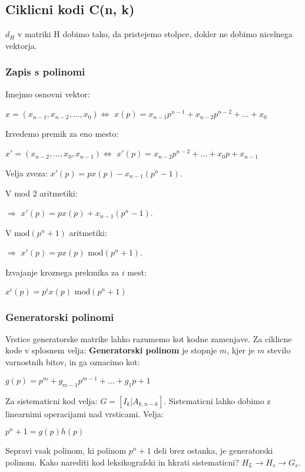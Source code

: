 \documentclass{article}
\begin{document}
\begin{multicols}{4}
	\subsection{Ciklicni kodi C(n, k)}
	$d_H$ v matriki H dobimo tako, da pristejemo stolpce, dokler ne dobimo nicelnega vektorja.

	\subsubsection{Zapis s polinomi}
	Imejmo osnovni vektor:
	\begin{center}
		$x = (x_{n-1}, x_{n-2}, \dots, x_0) \Leftrightarrow$
		$x(p) = x_{n-1}p^{n-1} + x_{n-2}p^{n-2} + \dots + x_0$
	\end{center}
	Izvedemo premik za eno mesto:
	\begin{center}
		$x' = (x_{n-2}, \dots, x_0, x_{n-1}) \Leftrightarrow$
		$x'(p) = x_{n-2}p^{n-2} + \dots + x_0p + x_{n-1}$
	\end{center}
	Velja zveza: $x'(p) = px(p) - x_{n-1}(p^n -1)$.

	V mod $2$ aritmetiki:
	\begin{center}
		$\Rightarrow$ $x'(p) = px(p) + x_{n-1}(p^n -1)$.
	\end{center}

	V $\text{mod}(p^n + 1)$ aritmetiki:
	\begin{center}
		$\Rightarrow$ $x'(p) = px(p) \text{ mod}(p^n + 1)$.
	\end{center}

	Izvajanje kroznega prekmika za $i$ mest:
	\begin{center}
		\begin{math}
			x^i(p) = p^i x(p) \text{ mod} (p^n + 1)
		\end{math}
	\end{center}

	\subsubsection{Generatorski polinomi}
	Vrstice generatorske matrike lahko razumemo kot kodne zamenjave.
	Za ciklicne kode v splosnem velja: \textbf{Generatorski polinom} je stopnje $m$, kjer je $m$ stevilo
	varnostnih bitov, in ga oznacimo kot:
	\begin{center}
		\begin{math}
			g(p) = p^m + g_{m-1}p^{m-1} + \dots + g_1p + 1
		\end{math}
	\end{center}
	Za sistematicni kod velja: $G = [I_k | A_{k, n-k}]$.
	Sistematicni lahko dobimo z linearnimi operacijami nad vrsticami.
	Velja:
	\begin{center}
		\begin{math}
			p^n + 1 = g(p)h(p)
		\end{math}
	\end{center}
	Sepravi vsak polinom, ki polinom $p^n + 1$ deli brez ostanka, je generatorski polinom.
	Kako narediti kod leksikografski in hkrati sistematicni? $H_L \rightarrow H_s \rightarrow G_s$.


\end{multicols}
\end{document}
